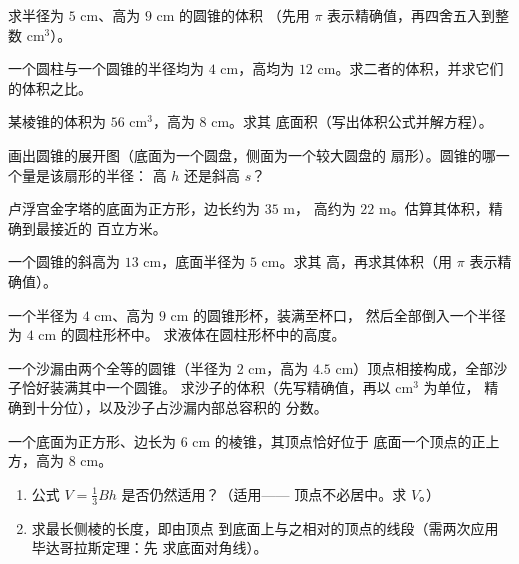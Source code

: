 \begin{exercise}[$\star$]\label{exo:g8:solids:3}
求半径为 $5$ cm、高为 $9$ cm 的圆锥的体积
（先用 $\pi$ 表示精确值，再四舍五入到整数 cm$^3$）。
\end{exercise}

\begin{exercise}[$\star$]\label{exo:g8:solids:4}
一个圆柱与一个圆锥的半径均为 $4$ cm，高均为
$12$ cm。求二者的体积，并求它们的体积之比。
\end{exercise}

\begin{exercise}[$\star$]\label{exo:g8:solids:5}
某棱锥的体积为 $56$ cm$^3$，高为 $8$ cm。求其
底面积（写出体积公式并解方程）。
\end{exercise}

\begin{exercise}[$\star$]\label{exo:g8:solids:6}
画出圆锥的展开图（底面为一个圆盘，侧面为一个较大圆盘的
扇形）。圆锥的哪一个量是该扇形的半径：
高 $h$ 还是斜高
$s$？
\end{exercise}

\begin{exercise}[$\star\star$]\label{exo:g8:solids:7}
卢浮宫金字塔的底面为正方形，边长约为 $35$ m，
高约为 $22$ m。估算其体积，精确到最接近的
百立方米。
\end{exercise}

\begin{exercise}[$\star\star$]\label{exo:g8:solids:8}
一个圆锥的斜高为 $13$ cm，底面半径为 $5$ cm。求其
高，再求其体积（用 $\pi$ 表示精确值）。
\end{exercise}

\begin{exercise}[$\star\star$]\label{exo:g8:solids:9}
一个半径为 $4$ cm、高为 $9$ cm 的圆锥形杯，装满至杯口，
然后全部倒入一个半径为 $4$ cm 的圆柱形杯中。
求液体在圆柱形杯中的高度。
\end{exercise}

\begin{exercise}[$\star\star$]\label{exo:g8:solids:10}
一个沙漏由两个全等的圆锥（半径为 $2$ cm，高为
$4.5$ cm）顶点相接构成，全部沙子恰好装满其中一个圆锥。
求沙子的体积（先写精确值，再以 cm$^3$ 为单位，
精确到十分位），以及沙子占沙漏内部总容积的
分数。
\end{exercise}

\begin{exercise}[$\star\star\star$]\label{exo:g8:solids:11}
一个底面为正方形、边长为 $6$ cm 的棱锥，其顶点恰好位于
底面一个顶点的正上方，高为 $8$ cm。
\begin{enumerate}
  \item 公式 $V = \frac13 Bh$ 是否仍然适用？（适用——
        顶点不必居中。求 $V$。）
  \item 求最长侧棱的长度，即由顶点
        到底面上与之相对的顶点的线段（需两次应用毕达哥拉斯定理：先
        求底面对角线）。
\end{enumerate}
\end{exercise}

